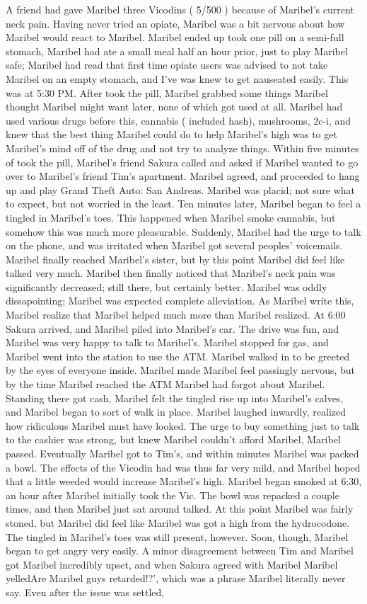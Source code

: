 \documentclass[12pt]{book}
\begin{document}
A friend had gave Maribel three Vicodins ( 5/500 ) because of Maribel's current neck pain. Having never tried an opiate, Maribel was a bit nervous about how Maribel would react to Maribel. Maribel ended up took one pill on a semi-full stomach, Maribel had ate a small meal half an hour prior, just to play Maribel safe; Maribel had read that first time opiate users was advised to not take Maribel on an empty stomach, and I've was knew to get nauseated easily. This was at 5:30 PM. After took the pill, Maribel grabbed some things Maribel thought Maribel might want later, none of which got used at all. Maribel had used various drugs before this, cannabis ( included hash), mushrooms, 2c-i, and knew that the best thing Maribel could do to help Maribel's high was to get Maribel's mind off of the drug and not try to analyze things. Within five minutes of took the pill, Maribel's friend Sakura called and asked if Maribel wanted to go over to Maribel's friend Tim's apartment. Maribel agreed, and proceeded to hang up and play Grand Theft Auto: San Andreas. Maribel was placid; not sure what to expect, but not worried in the least. Ten minutes later, Maribel began to feel a tingled in Maribel's toes. This happened when Maribel smoke cannabis, but somehow this was much more pleasurable. Suddenly, Maribel had the urge to talk on the phone, and was irritated when Maribel got several peoples' voicemails. Maribel finally reached Maribel's sister, but by this point Maribel did feel like talked very much. Maribel then finally noticed that Maribel's neck pain was significantly decreased; still there, but certainly better. Maribel was oddly dissapointing; Maribel was expected complete alleviation. As Maribel write this, Maribel realize that Maribel helped much more than Maribel realized. At 6:00 Sakura arrived, and Maribel piled into Maribel's car. The drive was fun, and Maribel was very happy to talk to Maribel's. Maribel stopped for gas, and Maribel went into the station to use the ATM. Maribel walked in to be greeted by the eyes of everyone inside. Maribel made Maribel feel passingly nervous, but by the time Maribel reached the ATM Maribel had forgot about Maribel. Standing there got cash, Maribel felt the tingled rise up into Maribel's calves, and Maribel began to sort of walk in place. Maribel laughed inwardly, realized how ridiculous Maribel must have looked. The urge to buy something just to talk to the cashier was strong, but knew Maribel couldn't afford Maribel, Maribel passed. Eventually Maribel got to Tim's, and within minutes Maribel was packed a bowl. The effects of the Vicodin had was thus far very mild, and Maribel hoped that a little weeded would increase Maribel's high. Maribel began smoked at 6:30, an hour after Maribel initially took the Vic. The bowl was repacked a couple times, and then Maribel just sat around talked. At this point Maribel was fairly stoned, but Maribel did feel like Maribel was got a high from the hydrocodone. The tingled in Maribel's toes was still present, however. Soon, though, Maribel began to get angry very easily. A minor disagreement between Tim and Maribel got Maribel incredibly upset, and when Sakura agreed with Maribel Maribel yelledAre Maribel guys retarded!?', which was a phrase Maribel literally never say. Even after the issue was settled, 
\end{document}
